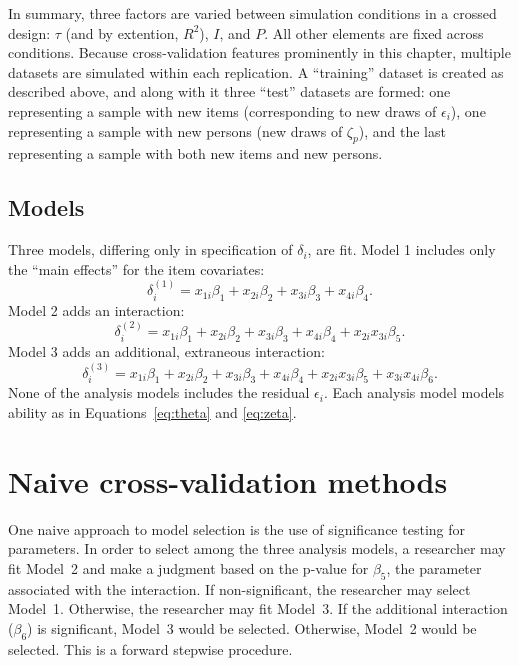\documentclass[12pt, letterpaper]{article}
\begin{document}
In summary, three factors are varied between simulation conditions in a crossed design: $\tau$ (and by extention, $R^2$), $I$, and $P$. All other elements are fixed across conditions. Because cross-validation features prominently in this chapter, multiple datasets are simulated within each replication. A ``training'' dataset is created as described above, and along with it three ``test'' datasets are formed: one representing a sample with new items (corresponding to new draws of $\epsilon_i$), one representing a sample with new persons (new draws of $\zeta_p$), and the last representing a sample with both new items and new persons.


\subsection{Models}

Three models, differing only in specification of $\delta_i$, are fit. Model 1 includes only the ``main effects'' for the item covariates:
\begin{equation}
\delta_i^{(1)} = x_{1i}\beta_1 + x_{2i}\beta_2 + x_{3i}\beta_3 + x_{4i}\beta_4
.\end{equation}
Model 2 adds an interaction:
\begin{equation}
\delta_i^{(2)} = x_{1i}\beta_1 + x_{2i}\beta_2 + x_{3i}\beta_3 + x_{4i}\beta_4
+ x_{2i}x_{3i}\beta_5
.\end{equation}
Model 3 adds an additional, extraneous interaction:
\begin{equation}
\delta_i^{(3)} = x_{1i}\beta_1 + x_{2i}\beta_2 + x_{3i}\beta_3 + x_{4i}\beta_4
+ x_{2i}x_{3i}\beta_5 + x_{3i}x_{4i}\beta_6
.\end{equation}
None of the analysis models includes the residual $\epsilon_i$. Each analysis model models ability as in Equations~\ref{eq:theta} and \ref{eq:zeta}. %


\section{Naive cross-validation methods}

One naive approach to model selection is the use of significance testing for parameters. In order to select among the three analysis models, a researcher may fit Model~2 and make a judgment based on the p-value for $\beta_5$, the parameter associated with the interaction. If non-significant, the researcher may select Model~1. Otherwise, the researcher may fit Model~3. If the additional interaction ($\beta_6$) is significant, Model~3 would be selected. Otherwise, Model~2 would be selected. This is a forward stepwise procedure.
\end{document}
